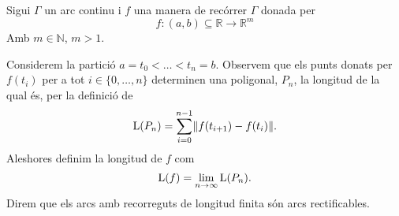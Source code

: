 \documentclass[../Apunts.tex]{subfiles}
\begin{document}
	\begin{definition}
		\label{def:long recorregut arc continu}
		Sigui \(\Gamma\) un arc continu i \(f\) una manera de recórrer \(\Gamma\) donada per
		\[f\colon(a,b)\subseteq\mathbb{R}\longrightarrow\mathbb{R}^{m}\]
		Amb \(m\in\mathbb{N}\), \(m>1\).
		
		Considerem la partició \(a=t_{0}<\dots<t_{n}=b\). Observem que els punts donats per \(f(t_{i})\) per a tot \(i\in\{0,\dots,n\}\) determinen una poligonal, \(P_{n}\), la longitud de la qual és, per la definició de 
		\[\Long(P_{n})=\sum_{i=0}^{n-1}\norm{f(t_{i+1})-f(t_{i})}.\]
		Aleshores definim la longitud de \(f\) com
		\[\operatorname{L}(f)=\lim_{n\to\infty}\operatorname{L}(P_{n}).\]
		Direm que els arcs amb recorreguts de longitud finita són arcs rectificables.
	\end{definition}
\end{document}
